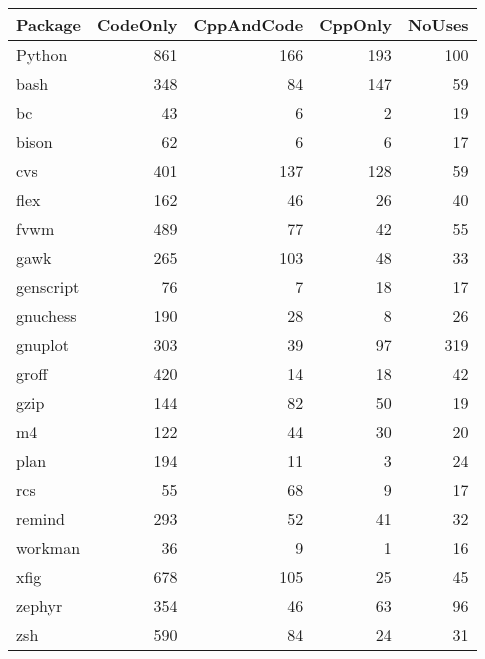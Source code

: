 \begin{tabular}{|l|r|r|r|r|}\hline
Package & CodeOnly & CppAndCode & CppOnly & NoUses\\\hline
Python & 861 & 166 & 193 & 100\\\hline
bash & 348 & 84 & 147 & 59\\\hline
bc & 43 & 6 & 2 & 19\\\hline
bison & 62 & 6 & 6 & 17\\\hline
cvs & 401 & 137 & 128 & 59\\\hline
flex & 162 & 46 & 26 & 40\\\hline
fvwm & 489 & 77 & 42 & 55\\\hline
gawk & 265 & 103 & 48 & 33\\\hline
genscript & 76 & 7 & 18 & 17\\\hline
gnuchess & 190 & 28 & 8 & 26\\\hline
gnuplot & 303 & 39 & 97 & 319\\\hline
groff & 420 & 14 & 18 & 42\\\hline
gzip & 144 & 82 & 50 & 19\\\hline
m4 & 122 & 44 & 30 & 20\\\hline
plan & 194 & 11 & 3 & 24\\\hline
rcs & 55 & 68 & 9 & 17\\\hline
remind & 293 & 52 & 41 & 32\\\hline
workman & 36 & 9 & 1 & 16\\\hline
xfig & 678 & 105 & 25 & 45\\\hline
zephyr & 354 & 46 & 63 & 96\\\hline
zsh & 590 & 84 & 24 & 31\\\hline
\end{tabular}
